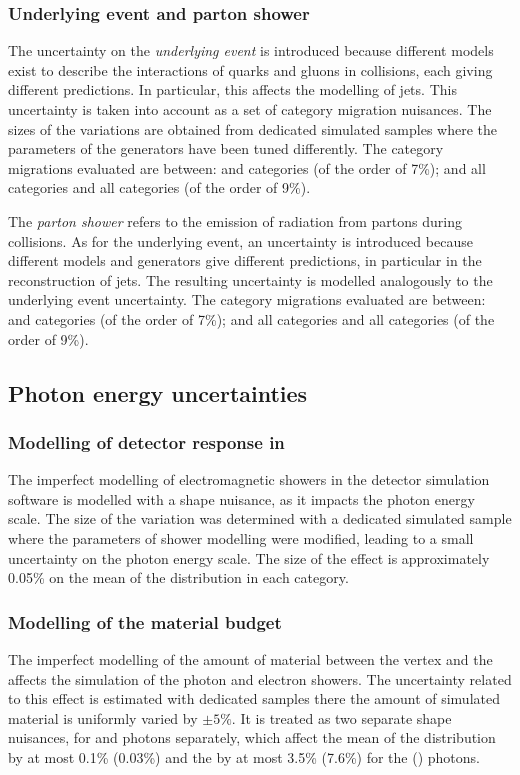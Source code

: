 \subsubsection{Underlying event and parton shower}
The uncertainty on the \emph{underlying event} is introduced because different models exist to describe the interactions of quarks and gluons in \pp collisions, each giving different predictions. In particular, this affects the modelling of jets. This uncertainty is taken into account as a set of category migration nuisances. The sizes of the variations are obtained from dedicated simulated samples where the parameters of the generators have been tuned differently. The category migrations evaluated are between:  and  categories (of the order of 7\%); and all \VBFTag categories and all \Untagged categories (of the order of 9\%).

The \emph{parton shower} refers to the emission of \QCD radiation from partons during \pp collisions. As for the underlying event, an uncertainty is introduced because different models and generators give different predictions, in particular in the reconstruction of jets. The resulting uncertainty is modelled analogously to the underlying event uncertainty.  The category migrations evaluated are between:  and  categories (of the order of 7\%); and all \VBFTag categories and all \Untagged categories (of the order of 9\%).


\subsection{Photon energy uncertainties}

\subsubsection{Modelling of detector response in \Geant}
The imperfect modelling of electromagnetic showers in the detector simulation software \Geant is modelled with a shape nuisance, as it impacts the photon energy scale. The size of the variation was determined with a dedicated simulated sample where the parameters of shower modelling were modified, leading to a small uncertainty on the photon energy scale. The size of the effect is approximately 0.05\% on the mean of the \mgg distribution in each category.

\subsubsection{Modelling of the material budget}
The imperfect modelling of the amount of material between the vertex and the \ECAL affects the simulation of the photon and electron showers. The uncertainty related to this effect is estimated with dedicated samples there the amount of simulated material is uniformly varied by $\pm 5\%$. It is treated as two separate shape nuisances, for \EB and \EE photons separately, which affect the mean of the \mgg distribution by at most 0.1\% (0.03\%) and the \effSigma by at most 3.5\% (7.6\%) for the \EB (\EE) photons.

